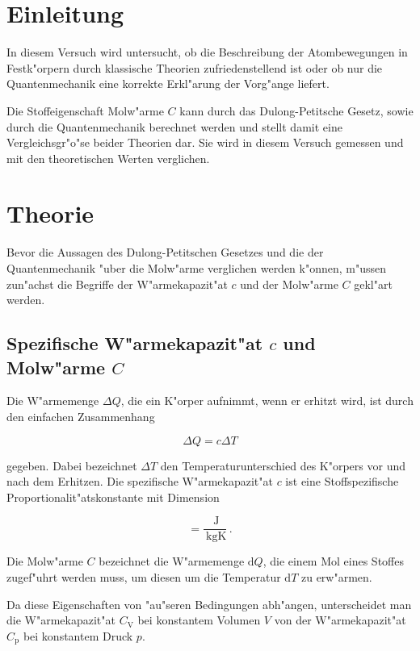 \section{Einleitung} %
\label{sec:einleitung}
	In diesem Versuch wird untersucht, ob die Beschreibung der Atombewegungen in Festk"orpern durch klassische Theorien zufriedenstellend ist oder ob nur die Quantenmechanik eine korrekte Erkl"arung der Vorg"ange liefert.

	Die Stoffeigenschaft Molw"arme $C$ kann durch das Dulong-Petitsche Gesetz, sowie durch die Quantenmechanik berechnet werden und stellt damit eine Vergleichsgr"o"se beider Theorien dar.
	Sie wird in diesem Versuch gemessen und mit den theoretischen Werten verglichen.

\section{Theorie} %
\label{sec:theorie}
	Bevor die Aussagen des Dulong-Petitschen Gesetzes und die der Quantenmechanik "uber die Molw"arme verglichen werden k"onnen, m"ussen zun"achst die Begriffe der W"armekapazit"at $c$ und der Molw"arme $C$ gekl"art werden.

	\subsection{Spezifische W"armekapazit"at $c$ und Molw"arme $C$}
	\label{subsec:waermekapazitaet}
		Die W"armemenge $\Delta Q$, die ein K"orper aufnimmt, wenn er erhitzt wird, ist durch den einfachen Zusammenhang

		\begin{equation*}
			\Delta Q = c \Delta T
		\end{equation*}

		gegeben. Dabei bezeichnet $\Delta T$ den Temperaturunterschied des K"orpers vor und nach dem Erhitzen. Die spezifische W"armekapazit"at $c$ ist eine Stoffspezifische Proportionalit"atskonstante mit Dimension

		\begin{equation*}
			[c] = \frac{\SI{}{\joule}}{\SI{}{\kilo \gram \kelvin}} \,.
		\end{equation*}

		Die Molw"arme $C$ bezeichnet die W"armemenge $\mathrm{d}Q$, die einem Mol eines Stoffes zugef"uhrt werden muss, um diesen um die Temperatur $\mathrm{d}T$ zu erw"armen.

		Da diese Eigenschaften von "au"seren Bedingungen abh"angen, unterscheidet man die W"armekapazit"at $C_\mathrm{V}$ bei konstantem Volumen $V$ von der W"armekapazit"at $C_\mathrm{p}$ bei konstantem Druck $p$.

